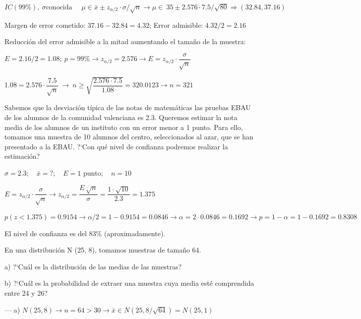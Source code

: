 $IC(99\%),\ \sigma \text{conocida } \quad \mu \in \bar x\pm z_{\alpha/2} \cdot \sigma / \sqrt{n} \to \mu \in \ 35\pm 2.576\cdot 7.5 / \sqrt{80} \Rightarrow (32.84,37.16)$

Margen de error cometido:  $37.16-32.84=4.32$; Error admisible: $4.32/2=2.16$

Reducción del error admisible a la mitad aumentando el tamaño de la muestra:

$E=2.16/2=1.08; \ p=99\% \to z_{\alpha/2}=2.576 \to E=z_{\alpha/2}\cdot \dfrac{\sigma}{\sqrt{n}} $

$1.08=2.576\cdot \dfrac{7.5}{\sqrt{n}} \ \to \ n \ge  \sqrt{\dfrac{2.576\cdot 7.5}{1.08}}=320.0123 \to n=321$



\vspace{4mm}
\begin{ejemplo}
\begin{ejer}
	Sabemos que la desviación típica de las notas de matemáticas las pruebas EBAU de  los alumnos de la comunidad valenciana es 2.3. Queremos estimar la nota media de los alumnos de un instituto con un error menor a 1 punto. Para ello, tomamos una muestra de 10 alumnos del centro, seleccionados al azar, que se han presentado a la EBAU.
?`Con qué nivel de confianza podremos realizar la estimación?
\end{ejer}
\end{ejemplo}

$\sigma=2.3; \quad \bar x= ?;\quad E=1 \text{ punto};\quad n=10$

$E=z_{\alpha/2}\cdot\dfrac{\sigma}{\sqrt{n}} \to z_{\alpha/2}=\dfrac{ E\ \sqrt{n} }{\sigma} =\dfrac{1\cdot \sqrt{10}}{2.3}=1.375$

$p(z<1.375)=0.9154 \to \alpha/2=1-0.9154=0.0846 \to \alpha=2\cdot 0.0846=0.1692 \to p=1-\alpha=1-0.1692=0.8308$

El nivel de confianza es del 83\% (aproximadamente).


\vspace{4mm}
\begin{ejemplo}
\begin{ejer}
	En una distribución N (25, 8), tomamos muestras de tamaño 64.

a) ?`Cuál es la distribución de las medias de las muestras?

b) ?`Cuál es la probabilidad de extraer una muestra cuya media esté comprendida entre 24 y 26?
\end{ejer}	
\end{ejemplo}
--- a) $N(25,8)\to n=64>30 \to \bar x \in N(25,8/\sqrt{64})=N(25,1)$

